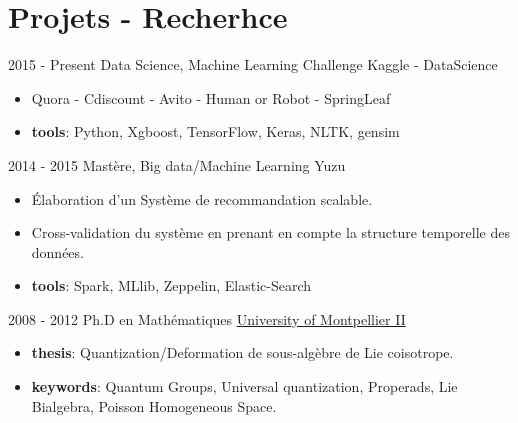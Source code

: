 \documentclass[letterpaper]{twentysecondcvfr} %
\begin{document}
\section{Projets - Recherhce}{\faClipboard}
\begin{twenty}
	\twentyitem
			{2015 - }
			{Present}
			{Data Science, Machine Learning Challenge}
			{Kaggle - DataScience}
			{}
			{\begin{itemize}
			 \item Quora - Cdiscount - Avito - Human or Robot - SpringLeaf
			 \item \textbf{tools}: Python, Xgboost, TensorFlow, Keras, NLTK, gensim
			\end{itemize}}
	\twentyitem
    	{2014 - 2015}
		{}
        {Mast\`ere, Big data/Machine Learning}
        {Yuzu}
        {}
        {\begin{itemize}
        \item \'Elaboration d'un Syst\`eme de recommandation scalable.
        \item Cross-validation du syst\`eme en prenant en compte la structure temporelle des donn\'ees.
        \item \textbf{tools}: Spark, MLlib, Zeppelin, Elastic-Search
		\end{itemize}}
	\twentyitem
			{2008 - 2012}
			{}
			{Ph.D en Math\'ematiques}
			{\href{http://www.umontpellier.fr/}{University of Montpellier II}}
			{}
			{\begin{itemize}
			\item \textbf{thesis}: Quantization/Deformation de sous-alg\`ebre de Lie coisotrope.
			\item \textbf{keywords}: Quantum Groups, Universal quantization, Properads, Lie Bialgebra, Poisson Homogeneous Space.
			\end{itemize}}
\end{twenty}
\end{document}
